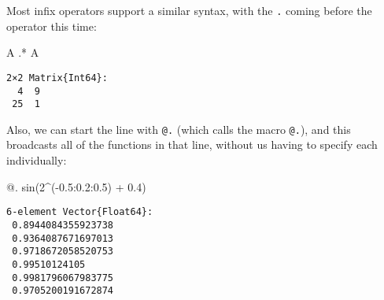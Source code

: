 \documentclass[
  letterpaper,
  DIV=11,
  numbers=noendperiod]{scrreprt}
\newenvironment{Shaded}{\begin{snugshade}}{\end{snugshade}}
\newcommand{\FloatTok}[1]{\textcolor[rgb]{0.68,0.00,0.00}{#1}}
\newcommand{\FunctionTok}[1]{\textcolor[rgb]{0.28,0.35,0.67}{#1}}
\newcommand{\NormalTok}[1]{\textcolor[rgb]{0.00,0.23,0.31}{#1}}
\newcommand{\OperatorTok}[1]{\textcolor[rgb]{0.37,0.37,0.37}{#1}}
\begin{document}
Most infix operators support a similar syntax, with the \texttt{.}
coming before the operator this time:

\begin{Shaded}
\begin{Highlighting}[]
\NormalTok{A }\OperatorTok{.*}\NormalTok{ A}
\end{Highlighting}
\end{Shaded}

\begin{verbatim}
2×2 Matrix{Int64}:
  4  9
 25  1
\end{verbatim}

Also, we can start the line with \texttt{@.} (which calls the macro
\texttt{@.}), and this broadcasts all of the functions in that line,
without us having to specify each individually:

\begin{Shaded}
\begin{Highlighting}[]
\NormalTok{@. }\FunctionTok{sin}\NormalTok{(}\FloatTok{2}\OperatorTok{\^{}}\NormalTok{(}\OperatorTok{{-}}\FloatTok{0.5}\OperatorTok{:}\FloatTok{0.2}\OperatorTok{:}\FloatTok{0.5}\NormalTok{) }\OperatorTok{+} \FloatTok{0.4}\NormalTok{)}
\end{Highlighting}
\end{Shaded}

\begin{verbatim}
6-element Vector{Float64}:
 0.8944084355923738
 0.9364087671697013
 0.9718672058520753
 0.99510124105
 0.9981796067983775
 0.9705200191672874
\end{verbatim}
\end{document}
